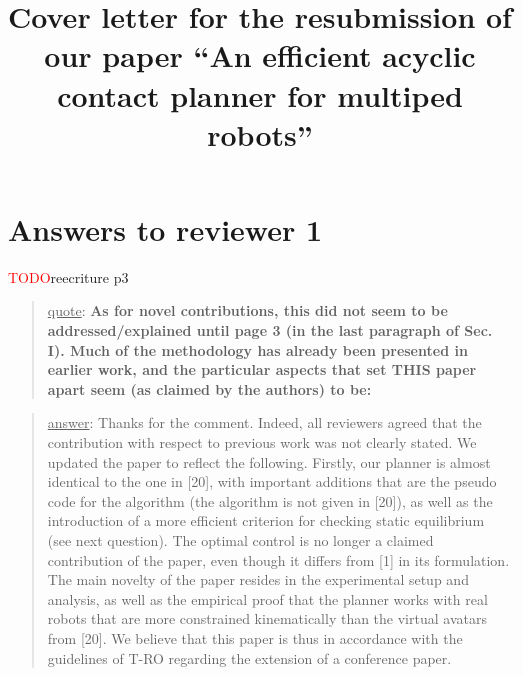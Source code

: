 \documentclass[a4paper]{article}
\author {}
\title {Cover letter for the resubmission of our paper ``An efficient acyclic contact planner for multiped robots''}
\date {}
\newcommand{\ndone}[0]{\textcolor{red}{TODO}}
\newcommand\quot[1]{\begin{quote} \underline{quote}: \textbf{#1}\end{quote}}
\newcommand\as[1]{\begin{quote} \underline{answer}: {#1}\end{quote} }
\begin{document}
\maketitle


\section{Answers to reviewer 1}
\ndone reecriture p3

\quot {As for novel contributions, this did not seem to be addressed/explained
until page 3 (in the last paragraph of Sec. I). Much of the methodology
has already been presented in earlier work, and the particular aspects
that set THIS paper apart seem (as claimed by the authors) to be: 
}

\as{Thanks for the comment. Indeed, all reviewers agreed that the contribution with respect to previous work was not clearly stated. We updated the paper to reflect the following. Firstly, our planner is almost identical to the one in [20], with important additions that are the pseudo code for the algorithm (the algorithm is not given in [20]), as well as the introduction of a more efficient criterion
for checking static equilibrium (see next question). The optimal control is no longer a claimed contribution of the paper, even though it differs from [1] in its formulation. The main
novelty of the paper resides in the experimental setup and analysis, as well as the empirical proof that the planner works with real robots that are more constrained kinematically than the virtual avatars from [20]. We believe that this paper is thus in accordance with the guidelines of T-RO regarding the extension of a conference paper.}
\end{document}
